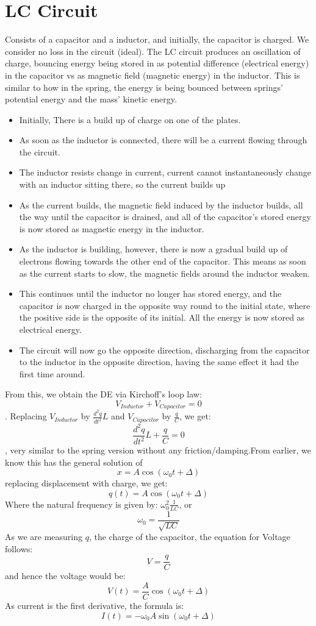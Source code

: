 \documentclass[10pt]{report}
\begin{document}
{\section{LC Circuit}
\par{Consists of a capacitor and a inductor, and initially, the capacitor is charged. We consider no loss in the circuit (ideal). The LC circuit produces an oscillation of charge, bouncing energy being stored in as potential difference (electrical energy) in the capacitor vs as magnetic field (magnetic energy) in the inductor. This is similar to how in the spring, the energy is being bounced between springs' potential energy and the mass' kinetic energy. 
\begin{itemize}
	\item{Initially, There is a build up of charge on one of the plates.}
	\item{As soon as the inductor is connected, there will be a current flowing through the circuit.}
	\item{The inductor resists change in current, current cannot instantaneously change with an inductor sitting there, so the current builds up}
	\item{As the current builds, the magnetic field induced by the inductor builds, all the way until the capacitor is drained, and all of the capacitor's stored energy is now stored as magnetic energy in the inductor.}
	\item{As the inductor is building, however, there is now a gradual build up of electrons flowing towards the other end of the capacitor. This means as soon as the current starts to slow, the magnetic fields around the inductor weaken. }
	\item{This continues until the inductor no longer has stored energy, and the capacitor is now charged in the opposite way round to the initial state, where the positive side is the opposite of its initial. All the energy is now stored as electrical energy. }
	\item{The circuit will now go the opposite direction, discharging from the capacitor to the inductor in the opposite direction, having the same effect it had the first time around. }
\end{itemize}
From this, we obtain the DE via Kirchoff's loop law: \[
V_{Inductor}+V_{Capacitor}=0
\]. Replacing $V_{Inductor}$ by $\frac{d^{2}q}{dt^{2}}L$ and $V_{Capacitor}$ by $\frac{q}{C}$, we get: \[
\frac{d^{2}q}{dt^{2}}L+\frac{q}{C}=0
\], very similar to the spring version without any friction/damping.From earlier, we know this has the general solution of \[
x=A\cos\left(\omega_{0}t+\Delta\right)
\] replacing displacement with charge, we get: \[
q\left(t\right)=A\cos\left(\omega_{0}t+\Delta\right)
\] Where the natural frequency is given by: $\omega_{0}^{2}\frac{1}{LC}$, or \[
\omega_{0}=\frac{1}{\sqrt{LC}}
\] As we are measuring $q$, the charge of the capacitor, the equation for Voltage follows:  \[
V=\frac{q}{C}
\] and hence the voltage would be: \[
V\left(t\right)=\frac{A}{C}\cos\left(\omega_{0}t+\Delta\right)
\] As current is the first derivative, the formula is: \[
I\left(t\right)=-\omega_{0}A\sin\left(\omega_{0}t+\Delta\right)
\] }
}
\end{document}
